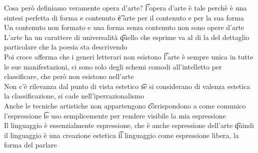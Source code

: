 \documentclass[12pt]{article}
\begin{document}
Cosa però definiamo veramente opera d'arte? \t l'opera d'arte è tale perchè è una sintesi perfetta di forma e contenuto \t è arte per il contenuto e per la sua forma \\
Un contenuto non formato e una forma senza contenuto non sono opere d'arte \\
L'arte ha un carattere di universalità \t quello che esprime va al di la del dettaglio particolare che la poesia sta descrivendo \\
Poi croce afferma che i generi letterari non esistono \t l'arte è sempre unica in tutte le sue manifestazioni, ci sono solo degli schemi comodi all'intelletto per classificare, che però non esistono nell'arte \\
Non c'è rilevanza dal punto di vista estetico \t se si considerano di valenza estetica la classificazione, si cade nell'iperrazionalismo \\
Anche le tecniche artistiche non appartengono \t corrispondono a come comunico l'espressione \t le uso semplicemente per rendere visibile la mia espressione \\
Il linguaggio è essenzialmente espressione, che è anche espressione dell'arte \t quindi il linguaggio è una creazione estetica \t il linguaggio come espressione libera, la forma del parlare
\end{document}
